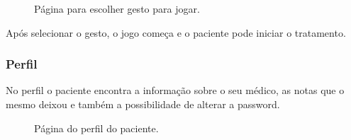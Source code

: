 \documentclass{TTUPhD}
\begin{document}
\begin{figure}[h!]
    \center
    \caption{Página para escolher gesto para jogar.}
    \label{fig:patient7}
\end{figure}

Após selecionar o gesto, o jogo começa e o paciente pode iniciar o tratamento.

\newpage

\subsubsection{Perfil}

No perfil o paciente encontra a informação sobre o seu médico, as notas que o mesmo deixou e também a possibilidade de alterar a password.

\begin{figure}[h!]
    \center
    \caption{Página do perfil do paciente.}
    \label{fig:patient3}
\end{figure}
\end{document}
